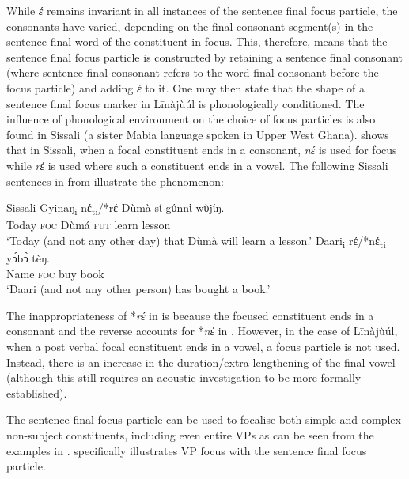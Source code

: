 \documentclass[output=paper,colorlinks,citecolor=brown]{langscibook}
\begin{document}
While \textit{έ} remains invariant in all instances of the sentence final focus particle, the consonants have varied, depending on the final consonant segment(s) in the sentence final word of the constituent in focus. This, therefore, means that the sentence final focus particle is constructed by retaining a sentence final consonant (where sentence final consonant refers to the word-final consonant before the focus particle) and adding \textit{έ} to it. One may then state that the shape of a sentence final focus marker in Līnàjùúl is phonologically conditioned. The influence of phonological environment on the choice of focus particles is also found in Sissali (a sister Mabia language spoken in Upper West Ghana). \citet{Dumah2017} shows that in Sissali, when a focal constituent ends in a consonant, \textit{nέ} is used for focus while \textit{rέ} is used where such a constituent ends in a vowel. The following Sissali sentences in  from \citet{Dumah2017} illustrate the phenomenon:

\ea%
    \label{ex:bisilki:18}
    Sissali \citep[84]{Dumah2017}
    \ea\label{ex:bisilki:18a}
    \gll    Gyinaŋ\textsubscript{i}	{nέ\textsubscript{ti}/*rέ}	Dùmà		sί	gύnnὶ wὺjίŋ.\\
            Today	\textsc{foc} 		Dùmá 		\textsc{fut} 	 learn 	        lesson\\
    \glt    ‘Today (and not any other day) that Dùmà will learn a lesson.’
    \ex\label{ex:bisilki:18b}
    \gll    Daari\textsubscript{i}	rέ/*nέ\textsubscript{ti}	yↄ́bↄ̀	 tèŋ.\\
            Name		\textsc{foc} 		buy	book\\
    \glt    ‘Daari (and not any other person) has bought a book.’
    \z
\z

The inappropriateness of *\textit{rέ} in  is because the focused constituent ends in a consonant and the reverse accounts for *\textit{nέ} in . However, in the case of Līnàjùúl, when a post verbal focal constituent ends in a vowel, a focus particle is not used. Instead, there is an increase in the duration/extra lengthening of the final vowel (although this still requires an acoustic investigation to be more formally established).

The sentence final focus particle can be used to focalise both simple and complex non-subject constituents, including even entire VPs as can be seen from the examples in .  specifically illustrates VP focus with the sentence final focus particle.
\end{document}
